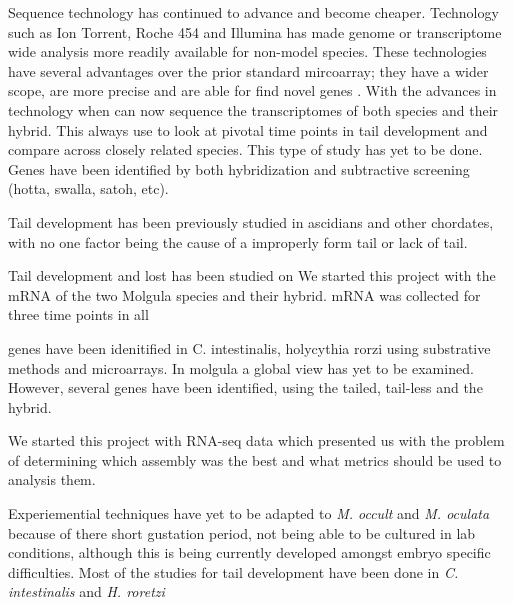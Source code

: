 Sequence technology has continued to advance and become cheaper. Technology such as Ion Torrent, Roche 454 and Illumina has made genome or transcriptome wide analysis more readily available for non-model species. These technologies have several advantages over the prior standard mircoarray; they have a wider scope, are more precise and are able for find novel genes \cite{}. 
With the advances in technology when can now sequence the transcriptomes of both species and their hybrid. This always use to look at pivotal time points in tail development and compare across closely related species. This type of study has yet to be done. Genes have been identified by both hybridization and subtractive screening (hotta, swalla, satoh, etc). 

Tail development has been previously studied in ascidians and other chordates, with no one factor being the cause of a improperly form tail or lack of tail. 

Tail development and lost has been studied on 
We started this project with the mRNA of the two Molgula species and their hybrid. mRNA was collected for three time points in all 

genes have been idenitified in C. intestinalis, holycythia rorzi using substrative methods and microarrays. In molgula a global view has yet to be examined. However, several genes have been identified, using the tailed, tail-less and the hybrid. 

We started this project with RNA-seq data which presented us with the problem of determining which assembly was the best and what metrics should be used to analysis them.

Experiemential techniques have yet to be adapted to \textit{M. occult} and \textit{M. oculata} because of there short gustation period, not being able to be cultured in lab conditions, although this is being currently developed amongst embryo specific difficulties. Most of the studies for tail development have been done in \textit{C. intestinalis} and \textit{H. roretzi}  